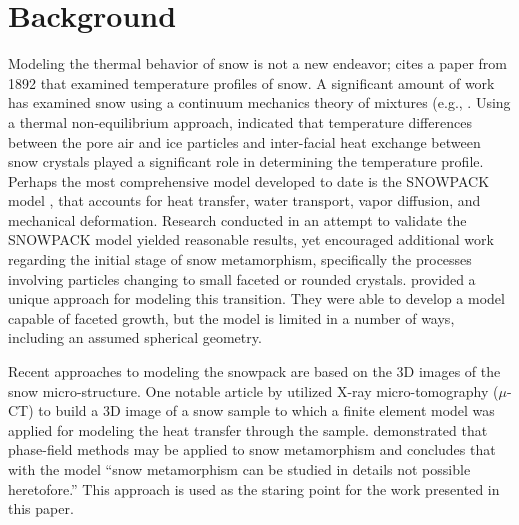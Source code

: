 \section{Background}\label{sec:background}
Modeling the thermal behavior of snow is not a new endeavor; \citet{lachapelle1960critique} cites a paper from 1892 that examined temperature profiles of snow. A significant amount of work has examined snow using a continuum mechanics theory of mixtures (e.g., \citet{adams1989constitutive, brown1999mixture}.  Using a thermal non-equilibrium approach, \citet{bartelt2004nonequilibrium} indicated that temperature differences between the pore air and ice particles and inter-facial heat exchange between snow crystals played a significant role in determining the temperature profile. Perhaps the most comprehensive model developed to date is the SNOWPACK model \citep{bartelt2002physical, lehning2002physicalb, lehning2002physical}, that accounts for heat transfer, water transport, vapor diffusion, and mechanical deformation.  Research conducted in an attempt to validate the SNOWPACK model yielded reasonable results, yet \citet{fierz2001assessment} encouraged additional work regarding the initial stage of snow metamorphism, specifically the processes involving particles changing to small faceted or rounded crystals. \citet{miller2009microstructural} provided a unique approach for modeling this transition. They were able to develop a model capable of faceted growth, but the model is limited in a number of ways, including an assumed spherical geometry.

Recent approaches to modeling the snowpack are based on the 3D images of the snow micro-structure.  One notable article by \citet{kaempfer2005microstructural} utilized X-ray micro-tomography ($\mu$-CT) to build a 3D image of a snow sample to which a finite element model was applied for modeling the heat transfer through the sample. \citet{kaempfer2009phase} demonstrated that phase-field methods may be applied to snow metamorphism and concludes that with the model ``snow metamorphism can be studied in details not possible heretofore.'' This approach is used as the staring point for the work presented in this paper.


